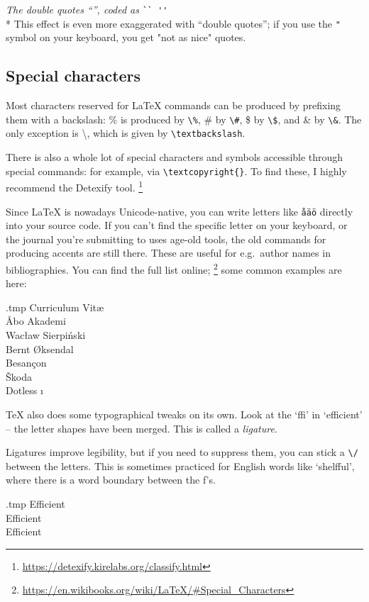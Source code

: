 \medskip\noindent\emph{The double quotes ``'', coded as} \verb|`` ''|\\*
This effect is even more exaggerated with ``double quotes'';
if you use the \verb|"| symbol on your keyboard,
you get "not as nice" quotes.



%
%
\subsection{Special characters}

Most characters reserved for \LaTeX{} commands can be produced by prefixing them with a backslash:
\% is produced by \verb|\%|, \# by \verb|\#|, \$ by \verb|\$|, and \& by \verb|\&|.
The only exception is \textbackslash, which is given by \verb|\textbackslash|.

There is also a whole lot of special characters and symbols accessible
through special commands: for example, \textcopyright{} via \verb|\textcopyright{}|.
To find these, I highly recommend the Detexify tool.%
\footnote{\url{https://detexify.kirelabs.org/classify.html}}

\bigskip\noindent%
Since \LaTeX{} is nowadays Unicode-native,
you can write letters like \verb|åäö| directly into your source code.
If you can't find the specific letter on your keyboard,
or the journal you're submitting to uses age-old tools,
the old commands for producing accents are still there.
These are useful for e.g.\ author names in bibliographies.
You can find the full list online;%
\footnote{\url{https://en.wikibooks.org/wiki/LaTeX/\#Special_Characters}}
some common examples are here:
%
\begin{VerbatimOut}{\jobname.tmp}
Curriculum Vit\ae\\
\r{A}bo Akademi\\
Wac\l{}aw Sierpi\'{n}ski\\
Bernt \O{}ksendal\\
Besan\c{c}on\\
\v{S}koda\\
Dotless \i
\end{VerbatimOut}
\ShowExample


\TeX{} also does some typographical tweaks on its own.
Look at the `ffi' in `efficient' -- the letter shapes have been merged.
This is called a \emph{ligature}.

Ligatures improve legibility, but if you need to suppress them,
you can stick a \verb|\/| between the letters.
This is sometimes practiced for English words like `shelf\/ful',
where there is a word boundary between the f's.
%
\begin{VerbatimOut}{\jobname.tmp}
Efficient\\
Ef\/ficient\\
Ef\/f\/icient
\end{VerbatimOut}
\ShowExample


